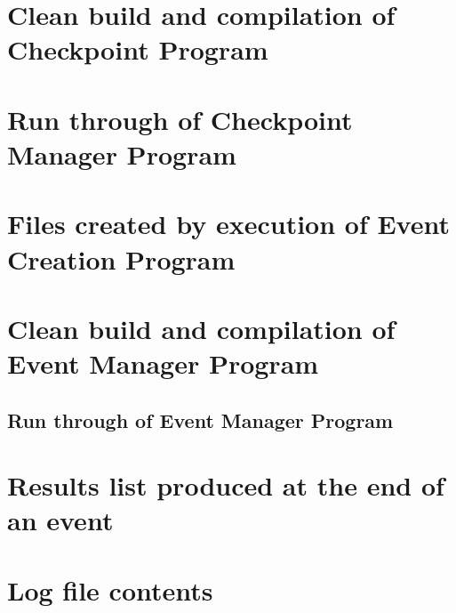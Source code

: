 \documentclass[a4paper,12pt]{article}
\begin{document}
\section{Clean build and compilation of Checkpoint Program}


\section{Run through of Checkpoint Manager Program}

\section{Files created by execution of Event Creation Program}

\section{Clean build and compilation of Event Manager Program}


\begin{landscape}
\section{Run through of Event Manager Program}

\end{landscape}

\section{Results list produced at the end of an event}

\section{Log file contents}
\end{document}
